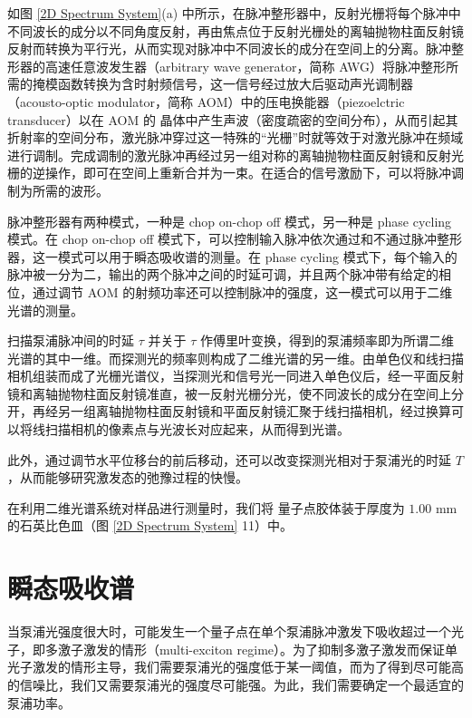 \documentclass{thesis}
\begin{document}
如图 \ref{2D Spectrum System}(a) 中所示，在脉冲整形器中，反射光栅将每个脉冲中不同波长的成分以不同角度反射，再由焦点位于反射光栅处的离轴抛物柱面反射镜反射而转换为平行光，从而实现对脉冲中不同波长的成分在空间上的分离。脉冲整形器的高速任意波发生器（arbitrary wave generator，简称 AWG）将脉冲整形所需的掩模函数转换为含时射频信号，这一信号经过放大后驱动声光调制器（acousto-optic modulator，简称 AOM）中的压电换能器（piezoelctric transducer）以在 AOM 的  晶体中产生声波（密度疏密的空间分布），从而引起其折射率的空间分布，激光脉冲穿过这一特殊的“光栅”时就等效于对激光脉冲在频域进行调制。完成调制的激光脉冲再经过另一组对称的离轴抛物柱面反射镜和反射光栅的逆操作，即可在空间上重新合并为一束。在适合的信号激励下，可以将脉冲调制为所需的波形。

脉冲整形器有两种模式，一种是 chop on-chop off 模式，另一种是 phase cycling 模式。在 chop on-chop off 模式下，可以控制输入脉冲依次通过和不通过脉冲整形器，这一模式可以用于瞬态吸收谱的测量。在 phase cycling 模式下，每个输入的脉冲被一分为二，输出的两个脉冲之间的时延可调，并且两个脉冲带有给定的相位，通过调节 AOM 的射频功率还可以控制脉冲的强度，这一模式可以用于二维光谱的测量。



扫描泵浦脉冲间的时延 $\tau$ 并关于 $\tau$ 作傅里叶变换，得到的泵浦频率即为所谓二维光谱的其中一维。而探测光的频率则构成了二维光谱的另一维。由单色仪和线扫描相机组装而成了光栅光谱仪，当探测光和信号光一同进入单色仪后，经一平面反射镜和离轴抛物柱面反射镜准直，被一反射光栅分光，使不同波长的成分在空间上分开，再经另一组离轴抛物柱面反射镜和平面反射镜汇聚于线扫描相机，经过换算可以将线扫描相机的像素点与光波长对应起来，从而得到光谱。

此外，通过调节水平位移台的前后移动，还可以改变探测光相对于泵浦光的时延 $T$，从而能够研究激发态的弛豫过程的快慢。

在利用二维光谱系统对样品进行测量时，我们将  量子点胶体装于厚度为 $1.00$ mm 的石英比色皿（图 \ref{2D Spectrum System} \textcircled{\footnotesize{11}}）中。

\section{瞬态吸收谱}
当泵浦光强度很大时，可能发生一个量子点在单个泵浦脉冲激发下吸收超过一个光子，即多激子激发的情形（multi-exciton regime）。为了抑制多激子激发而保证单光子激发的情形主导，我们需要泵浦光的强度低于某一阈值，而为了得到尽可能高的信噪比，我们又需要泵浦光的强度尽可能强。为此，我们需要确定一个最适宜的泵浦功率。
\end{document}
